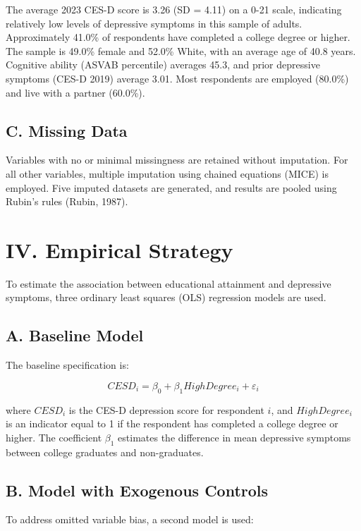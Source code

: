 \documentclass[
  12pt,
]{article}
\begin{document}
The average 2023 CES-D score is 3.26 (SD = 4.11) on a 0-21 scale,
indicating relatively low levels of depressive symptoms in this sample
of adults. Approximately 41.0\% of respondents have completed a college
degree or higher. The sample is 49.0\% female and 52.0\% White, with an
average age of 40.8 years. Cognitive ability (ASVAB percentile) averages
45.3, and prior depressive symptoms (CES-D 2019) average 3.01. Most
respondents are employed (80.0\%) and live with a partner (60.0\%).

\subsection{C. Missing Data}\label{c.-missing-data}

Variables with no or minimal missingness are retained without
imputation. For all other variables, multiple imputation using chained
equations (MICE) is employed. Five imputed datasets are generated, and
results are pooled using Rubin's rules (Rubin, 1987).

\section{IV. Empirical Strategy}\label{iv.-empirical-strategy}

To estimate the association between educational attainment and
depressive symptoms, three ordinary least squares (OLS) regression
models are used.

\subsection{A. Baseline Model}\label{a.-baseline-model}

The baseline specification is:

\[ CESD_i = \beta_0 + \beta_1 HighDegree_i + \varepsilon_i \]

where \(CESD_i\) is the CES-D depression score for respondent \(i\), and
\(HighDegree_i\) is an indicator equal to 1 if the respondent has
completed a college degree or higher. The coefficient \(\beta_1\)
estimates the difference in mean depressive symptoms between college
graduates and non-graduates.

\subsection{B. Model with Exogenous
Controls}\label{b.-model-with-exogenous-controls}

To address omitted variable bias, a second model is used:
\end{document}
